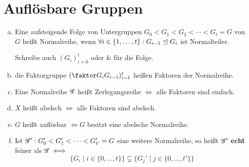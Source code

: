 \documentclass[a4paper]{report}
\begin{document}
\section{Auflösbare Gruppen} %
\begin{defi}
  \begin{enumerate}[(a)]
    \item Eine aufsteigende Folge von Untergruppen $G_{0} < G_{1} < G_{2} < \cdots < G_{t} = G$ von $G$ heißt Normalreihe, wenn
          $\forall i \in \{1, \ldots, t\} : G_{i-1} \trianglelefteq G_{i}$ ist Normalteiler.

          Schreibe auch $(G_{i})_{i=0}^{t}$ oder $\&$ für die Folge.
    \item die Faktorgruppe $(\fak{G_{i}}{G_{i-1}})_{i=1}^{t}$ heißen Faktoren der Normalreihe.
    \item Eine Normalreihe $\mathscr{G}$ heißt Zerlegungsreihe $\iff$ alle Faktoren sind einfach.
    \item $X$ heißt abelsch $\iff$ alle Faktoren sind abelsch.
    \item $G$ heißt auflösbar $\iff G$ besitzt eine abelsche Normalreihe.
    \item Ist $\mathscr{G}': G_{0}' < G_{1}' < \cdots < G'_{t'} = G$ eine weitere Normalreihe, so heißt $\mathscr{G}'$ \textbf{echt} feiner als $\mathscr{G} \iff$
          \[\{G_{i} \mid i \in \{0, ..., t\}\} \subsetneq \{G_{j}' \mid j \in \{0, ..., t'\}\}\]
  \end{enumerate}
\end{defi}
\begin{bsp*} %

\end{bsp*}
\end{document}
